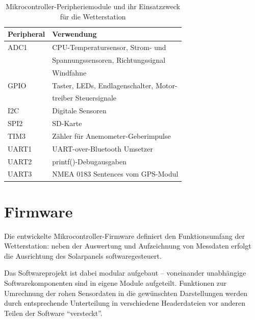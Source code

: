     \begin{table}[H]
        \centering
        \begin{tabular}{|l|l|}
            \hline
            \textbf{Peripheral} & \textbf{Verwendung}                   \\
            \hline
            ADC1                & CPU-Temperatursensor,  Strom- und     \\
                                & Spannungssensoren, Richtungssignal    \\
                                & Windfahne                             \\
            GPIO                & Taster, LEDs, Endlagenschalter, Motor-\\
                                & treiber Steuersignale                 \\
            I2C                 & Digitale Sensoren                     \\
            SPI2                & SD-Karte                              \\
            TIM3                & Zähler für Anemometer-Geberimpulse    \\
            UART1               & UART-over-Bluetooth Umsetzer          \\
            UART2               & printf()-Debugausgaben                \\
            UART3               & NMEA 0183 Sentences vom GPS-Modul     \\
            \hline
        \end{tabular}
        \caption{Mikrocontroller-Peripheriemodule und ihr Einsatzzweck für die Wetterstation}
    \end{table}    

\pagebreak
\section{Firmware}\label{cha:C-Code}
    Die entwickelte Mikrocontroller-Firmware definiert den Funktionsumfang der Wetterstation: neben der Auswertung und Aufzeichnung von Messdaten erfolgt die Ausrichtung des Solarpanels softwaregesteuert.
    
    Das Softwareprojekt ist dabei modular aufgebaut -- voneinander unabhängige Softwarekomponenten sind in eigene Module aufgeteilt. Funktionen zur Umrechnung der rohen Sensordaten in die gewünschten Darstellungen werden durch entsprechende Unterteilung in verschiedene Headerdateien vor anderen Teilen der Software ``versteckt''.
    
